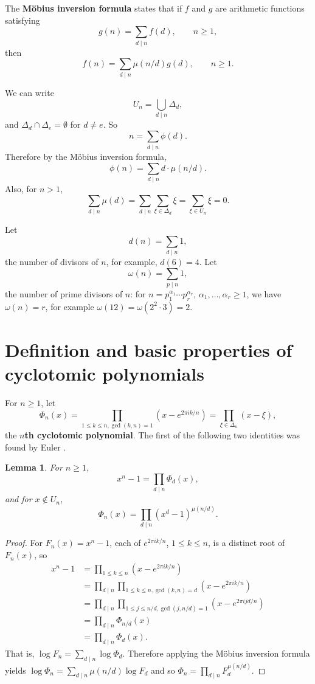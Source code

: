 \documentclass{amsart}
\newtheorem{lemma}[theorem]{Lemma}
\theoremstyle{definition}
\begin{document}
The \textbf{M\"obius inversion formula} states that if $f$ and $g$ are arithmetic functions satisfying
\[
g(n) = \sum_{d \mid n} f(d),\qquad n \geq 1,
\]
then
\[
f(n) = \sum_{d \mid n} \mu(n/d) g(d), \qquad n \geq 1.
\]

We can write
\[
U_n = \bigcup_{d \mid n} \Delta_d,
\]
and $\Delta_d \cap \Delta_e = \emptyset$ for $d \neq e$. 
So
\[
n = \sum_{d \mid n} \phi(d).
\]
Therefore by the M\"obius inversion formula,
\[
\phi(n) = \sum_{d \mid n} d \cdot \mu(n/d).
\]
Also, for $n > 1$,
\begin{equation}
\sum_{d \mid n} \mu(d) = \sum_{d \mid n} \sum_{\xi \in \Delta_d} \xi = \sum_{\xi \in U_n} \xi = 0.
\label{mobiussum}
\end{equation}

Let
\[
d(n) = \sum_{d \mid n} 1,
\]
the number of divisors of $n$, for example, $d(6) = 4$. Let
\[
\omega(n)=\sum_{p \mid n} 1,
\]
the number of prime divisors of $n$: for $n=p_1^{\alpha_1} \cdots p_r^{\alpha_r}$, $\alpha_1,\ldots,\alpha_r \geq 1$,
we have $\omega(n)=r$, for example
$\omega(12)=\omega(2^2 \cdot 3) = 2$. 








\section{Definition and basic properties of cyclotomic polynomials}
For $n \geq 1$, let
\[
\Phi_n(x) =\prod_{1\le k\le n, \gcd(k,n)=1}
(x-e^{2\pi i k/n})
= \prod_{\xi \in \Delta_n} (x-\xi),
\]
the \textbf{$n$th cyclotomic polynomial}.
The first of the following two identities was found by Euler \cite[pp.~199--200, Chap. III, \S VI]{weil}.

\begin{lemma}
For $n \geq 1$,
\[
x^n-1 = \prod_{d \mid n} \Phi_d(x),
\]
and for $x \not \in U_n$,
\[
\Phi_n(x) = \prod_{d \mid n} (x^d-1)^{\mu(n/d)}.
\]
\label{mobiuslemma}
\end{lemma}
\begin{proof}
For $F_n(x) = x^n-1$, 
each of $e^{2\pi ik/n}$, $1 \leq k \leq n$, is a distinct root of $F_n(x)$, so
\begin{align*}
x^n-1 &= \prod_{1 \leq k \leq n} (x-e^{2\pi ik/n}) \\
&=\prod_{d \mid n} \prod_{1\le k\le n, \gcd(k,n)=d}
(x-e^{2\pi i k/n})\\
&=\prod_{d \mid n}\prod_{1\le j \le n/d, \gcd(j,n/d)=1} (x-e^{2\pi ijd/n})\\
&=\prod_{d \mid n} \Phi_{n/d}(x)\\
&=\prod_{d \mid n} \Phi_d(x).
\end{align*}
That is, $\log F_n = \sum_{d \mid n} \log \Phi_d$. Therefore applying the M\"obius inversion formula yields
$\log \Phi_n = \sum_{d \mid n} \mu(n/d) \log F_d$ and so
$\Phi_n = \prod_{d \mid n} F_{d}^{\mu(n/d)}$.
\end{proof}
\end{document}
